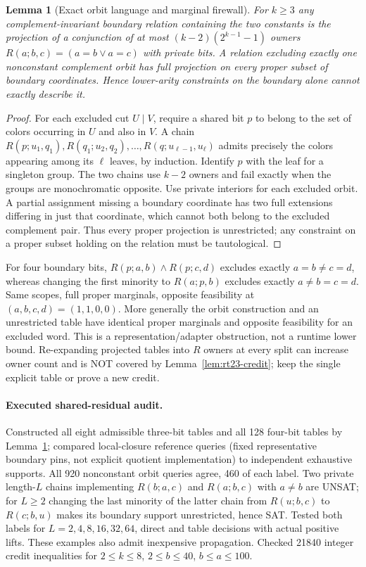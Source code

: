 \documentclass[11pt]{article}
\newtheorem{lemma}[theorem]{Lemma}
\begin{document}
\begin{lemma}[Exact orbit language and marginal firewall]\label{lem:rt23-orbit}
For $k\ge3$ any complement-invariant boundary relation containing the two constants is the projection of a conjunction of at most $(k-2)(2^{k-1}-1)$ owners $R(a;b,c)=(a=b\lor a=c)$ with private bits. A relation excluding exactly one nonconstant complement orbit has full projection on every proper subset of boundary coordinates. Hence lower-arity constraints on the boundary alone cannot exactly describe it.
\end{lemma}
\begin{proof}
For each excluded cut $U\mid V$, require a shared bit $p$ to belong to the set of colors occurring in $U$ and also in $V$. A chain $R(p;u_1,q_1),R(q_1;u_2,q_2),\ldots,R(q;u_{\ell-1},u_\ell)$ admits precisely the colors appearing among its $\ell$ leaves, by induction. Identify $p$ with the leaf for a singleton group. The two chains use $k-2$ owners and fail exactly when the groups are monochromatic opposite. Use private interiors for each excluded orbit. A partial assignment missing a boundary coordinate has two full extensions differing in just that coordinate, which cannot both belong to the excluded complement pair. Thus every proper projection is unrestricted; any constraint on a proper subset holding on the relation must be tautological.
\end{proof}
For four boundary bits, $R(p;a,b)\land R(p;c,d)$ excludes exactly $a=b\ne c=d$, whereas changing the first minority to $R(a;p,b)$ excludes exactly $a\ne b=c=d$. Same scopes, full proper marginals, opposite feasibility at $(a,b,c,d)=(1,1,0,0)$. More generally the orbit construction and an unrestricted table have identical proper marginals and opposite feasibility for an excluded word. This is a representation/adapter obstruction, not a runtime lower bound. Re-expanding projected tables into $R$ owners at every split can increase owner count and is NOT covered by Lemma~\ref{lem:rt23-credit}; keep the single explicit table or prove a new credit.

\paragraph{Executed shared-residual audit.}
Constructed all eight admissible three-bit tables and all 128 four-bit tables by Lemma~\ref{lem:rt23-orbit}; compared local-closure reference queries (fixed representative boundary pins, not explicit quotient implementation) to independent exhaustive supports. All 920 nonconstant orbit queries agree, 460 of each label. Two private length-$L$ chains implementing $R(b;a,c)$ and $R(a;b,c)$ with $a\ne b$ are UNSAT; for $L\ge2$ changing the last minority of the latter chain from $R(u;b,c)$ to $R(c;b,u)$ makes its boundary support unrestricted, hence SAT. Tested both labels for $L=2,4,8,16,32,64$, direct and table decisions with actual positive lifts. These examples also admit inexpensive propagation. Checked 21840 integer credit inequalities for $2\le k\le8$, $2\le b\le40$, $b\le a\le100$.
\end{document}

